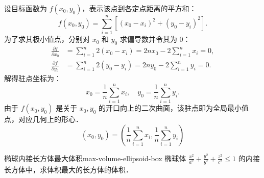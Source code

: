 \begin{solution}
    设目标函数为 $f(x_0, y_0)$，表示该点到各定点距离的平方和：
    \begin{equation}
        f(x_0, y_0) = \sum_{i=1}^{n} \left[ (x_0 - x_i)^2 + (y_0 - y_i)^2 \right].
    \end{equation}
    为了求其极小值点，分别对 $x_0$ 和 $y_0$ 求偏导数并令其为 $0$：
    \begin{equation}
        \begin{aligned}
            \frac{\partial f}{\partial x_0} & = \sum_{i=1}^{n} 2(x_0 - x_i) = 2nx_0 - 2\sum_{i=1}^{n} x_i = 0, \\
            \frac{\partial f}{\partial y_0} & = \sum_{i=1}^{n} 2(y_0 - y_i) = 2ny_0 - 2\sum_{i=1}^{n} y_i = 0.
        \end{aligned}
    \end{equation}
    解得驻点坐标为：
    \begin{equation}
        x_0 = \frac{1}{n} \sum_{i=1}^{n} x_i, \quad y_0 = \frac{1}{n} \sum_{i=1}^{n} y_i.
    \end{equation}
    由于 $f(x_0, y_0)$ 是关于 $x_0, y_0$ 的开口向上的二次曲面，该驻点即为全局最小值点，对应几何上的形心．
    \begin{equation}
        \boxed{(x_0, y_0) = \left( \frac{1}{n} \sum_{i=1}^{n} x_i, \frac{1}{n} \sum_{i=1}^{n} y_i \right)}
    \end{equation}
\end{solution}


\begin{problem}{椭球内接长方体最大体积}{max-volume-ellipsoid-box}
    椭球体 $\frac{x^2}{a^2} + \frac{y^2}{b^2} + \frac{z^2}{c^2} \le 1$ 的内接长方体中，求体积最大的长方体的体积．
\end{problem}

